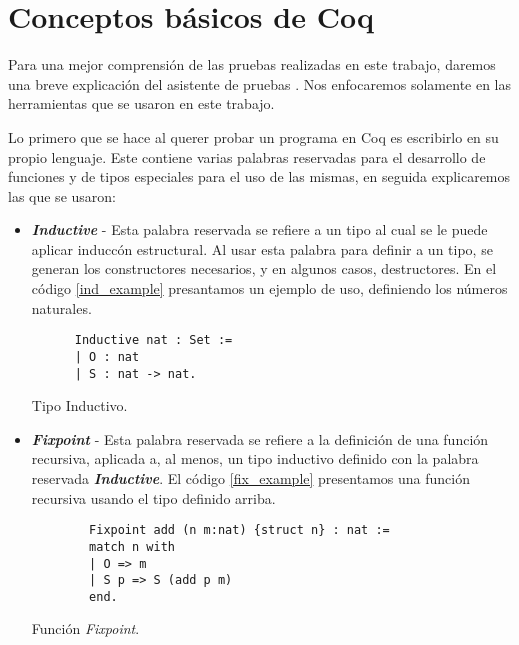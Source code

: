 \appendix
\chapter{Conceptos básicos de {\sc Coq}}

Para una mejor comprensi\'on de las pruebas realizadas en este trabajo, daremos una breve explicación
del asistente de pruebas {\coq}. Nos enfocaremos solamente en las herramientas que se usaron en este
trabajo.

Lo primero que se hace al querer probar un programa en Coq es escribirlo en su propio lenguaje. Este
contiene varias palabras reservadas para el desarrollo de funciones y de tipos especiales para el uso
de las mismas, en seguida explicaremos las que se usaron:

\begin{itemize}
  \item \textbf{\textit{Inductive}} - Esta palabra reservada se refiere a un tipo al cual se le puede aplicar inducc\'on
    estructural. Al usar esta palabra para definir a un tipo, se generan los constructores necesarios, y en algunos casos,
    destructores\cite{IndAndRec}. En el c\'odigo \ref{ind_example} presantamos un ejemplo de uso, definiendo los 
    n\'umeros naturales.
    \begin{listing}[!ht]
    \centering
    \captionsetup{justification=centering}
    \begin{verbatim}
      Inductive nat : Set :=
      | O : nat
      | S : nat -> nat. 
    \end{verbatim}
    \caption{Tipo Inductivo.}
    \label{ind_example}
    \end{listing}
  \item \textbf{\textit{Fixpoint}} - Esta palabra reservada se refiere a la definici\'on de una funci\'on recursiva, aplicada a, al menos, 
    un tipo inductivo definido con la palabra reservada \textbf{\textit{Inductive}}\cite{IndAndRec}. El c\'odigo \ref{fix_example} presentamos una funci\'on recursiva usando el tipo definido arriba. 
    \begin{listing}[!ht]
      \centering
      \captionsetup{justification=centering}
      \begin{verbatim}
        Fixpoint add (n m:nat) {struct n} : nat :=
        match n with
        | O => m
        | S p => S (add p m)
        end. 
      \end{verbatim}
      \caption{Funci\'on \textit{Fixpoint}.}
      \label{fix_example}
      \end{listing}

\end{itemize}

